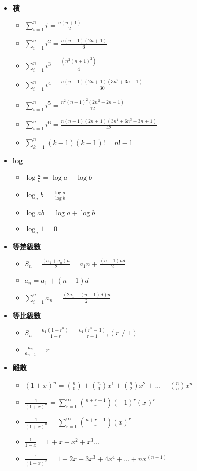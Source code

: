 \usepackage{amsmath}

\begin{itemize}
  \item \textbf{積}
  \begin{itemize}
    \item $\sum \limits_{i=1}^n i = \frac{n(n+1)}{2}$
    \item $\sum \limits_{i=1}^n i^2 = \frac{n(n+1)(2n+1)}{6}$
    \item $\sum \limits_{i=1}^n i^3 = \frac{(n^2(n+1)^2)}{4}$
    \item $\sum \limits_{i=1}^n i^4 = \frac{n(n+1)(2n+1)(3n^2+3n-1)}{30}$
    \item $\sum \limits_{i=1}^n i^5 = \frac{n^2(n+1)^2(2n^2+2n-1)}{12}$
    \item $\sum \limits_{i=1}^n i^6 = \frac{n(n+1)(2n+1)(3n^4+6n^3-3n+1)}{42}$
    \item $\sum \limits_{k=1}^n (k-1)(k-1)! = n!-1$
  \end{itemize}
  
  \item \textbf{log}
  \begin{itemize}
    \item $\log\frac{a}{b} = \log a - \log b$
    \item $\log_a b = \frac{\log a}{\log b}$
    \item $\log ab = \log a + \log b$
    \item $\log_a 1 = 0$
  \end{itemize}
  
  
  \item \textbf{等差級數}
  \begin{itemize}
    \item $S_n = \frac{(a_1 + a_n)n}{2} = a_1n + \frac{(n-1)nd}{2}$
    \item $a_n = a_1 + (n-1)d$
    \item $\sum \limits_{i=1}^n a_n = \frac{(2a_1+(n-1)d)n}{2}$
  \end{itemize}
  
  \item \textbf{等比級數}
  \begin{itemize}
    \item $S_n = \frac{a_1(1-r^n)}{1-r} = \frac{a_1(r^n-1)}{r-1}, (r \neq 1)$
    \item $\frac{a_n}{a_{n-1}} = r$
  \end{itemize}

  \item \textbf{離散}
  \begin{itemize}
    \item $(1+x)^n = \binom{n}{0} + \binom{n}{1}x^1 + \binom{n}{2}x^2 + ... + \binom{n}{n}x^n$
    \item $\frac{1}{(1+x)^n} = \sum \limits_{r=0}^\infty \binom{n+r-1}{r}(-1)^r(x)^r$
    \item $\frac{1}{(1+x)^n} = \sum \limits_{r=0}^\infty \binom{n+r-1}{r}(x)^r$
    \item $\frac{1}{1-x} = 1+x+x^2+x^3...$
    \item $\frac{1}{(1-x)^2} = 1+2x+3x^3+4x^4+...+nx^(n-1)$
  \end{itemize}


\end{itemize}
